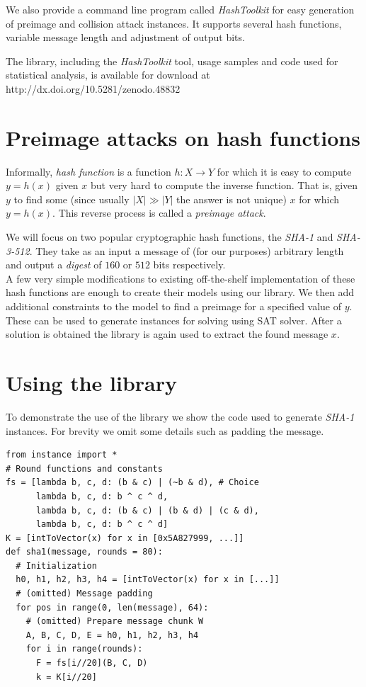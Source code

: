 \documentclass[myposter,portrait]{sciposter}
\def\mysection#1{
{\color{sectionCol}\section*{\sc\bfseries #1}}}
\begin{document}
\begin{multicols*}{3}
We also provide a command line program called \emph{HashToolkit} for easy generation of preimage and collision attack instances.
It supports several hash functions, variable message length and adjustment of output bits.
~\\

\vfill

\begin{minipage}[t][][b]{.59\columnwidth}
The library, including the \emph{HashToolkit} tool, usage samples and code used for statistical analysis, is available for download at http://dx.doi.org/10.5281/zenodo.48832
\end{minipage}
\begin{minipage}[t][][t]{.4\columnwidth}
\hfill {}
\end{minipage}

\columnbreak
\mysection{Preimage attacks on hash functions}
Informally, \emph{hash function} is a function $h: X \to Y$ for which it is easy to compute $y = h(x)$ given $x$ but very hard to compute the inverse function.
That is, given $y$ to find some (since usually $|X| \gg |Y|$ the answer is not unique) $x$ for which $y = h(x)$.
This reverse process is called a \emph{preimage attack}.

We will focus on two popular cryptographic hash functions, the \emph{SHA-1} and \emph{SHA-3-512}.
They take as an input a message of (for our purposes) arbitrary length and output a \emph{digest} of $160$ or $512$ bits respectively.
~\\

A few very simple modifications to existing off-the-shelf implementation of these hash functions are enough to create their models using our library.
We then add additional constraints to the model to find a preimage for a specified value of $y$.
These can be used to generate instances for solving using SAT solver.
After a solution is obtained the library is again used to extract the found message $x$.

\mysection{Using the library}
To demonstrate the use of the library we show the code used to generate \emph{SHA-1} instances.
For brevity we omit some details such as padding the message.
\begin{verbatim}
from instance import *
# Round functions and constants
fs = [lambda b, c, d: (b & c) | (~b & d), # Choice
      lambda b, c, d: b ^ c ^ d,
      lambda b, c, d: (b & c) | (b & d) | (c & d),
      lambda b, c, d: b ^ c ^ d]
K = [intToVector(x) for x in [0x5A827999, ...]]
def sha1(message, rounds = 80):
  # Initialization
  h0, h1, h2, h3, h4 = [intToVector(x) for x in [...]]
  # (omitted) Message padding
  for pos in range(0, len(message), 64):
    # (omitted) Prepare message chunk W
    A, B, C, D, E = h0, h1, h2, h3, h4
    for i in range(rounds):
      F = fs[i//20](B, C, D)
      k = K[i//20]
      

\end{verbatim}
\end{multicols*}
\end{document}

